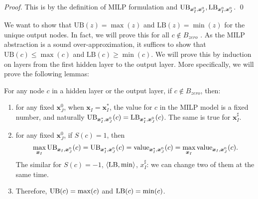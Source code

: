 			\begin{proof}
				This is by the definition of MILP formulation and $\mathrm{UB}_{\boldsymbol{x}^0_I,\boldsymbol{x}^0_J}, \mathrm{LB}_{\boldsymbol{x}^0_I,\boldsymbol{x}^0_J}$. \qed
			\end{proof}
			
	
			
			
			We want to show that $\mathrm{UB}(z) = \max (z)$ and $\mathrm{LB}(z) = \min (z)$ for the unique output nodes. In fact, we will prove this for all $c\notin B_{zero}$ . As the MILP abstraction is a sound over-approximation, 
			it suffices to show that $\mathrm{UB}(c)\leq \max (c)$ and $\mathrm{LB}(c) \geq \min (c)$. We will prove this by induction on layers from the first hidden layer to the output layer. More specifically, we will prove the following lemmas:
			
			
			\begin{lemma} \label{lem:main}
				For any node $c$ in a hidden layer or the output layer, if $c\notin B_{zero}$, then:		\begin{enumerate}
					\item for any fixed $\boldsymbol{x}^0_J$, when  $\boldsymbol{x}_I=\boldsymbol{x}^*_I$, the value for $c$ in the MILP model is a fixed number, and naturally $\mathrm{UB}_{\boldsymbol{x}^*_I,\boldsymbol{x}^0_J}(c)=\mathrm{LB}_{\boldsymbol{x}^*_I,\boldsymbol{x}^0_J}(c)$. The same is true for $\boldsymbol{x}^\sharp_I$.
					
					\item for any fixed $\boldsymbol{x}^0_J$, if $S(c)=1$, then $$\max_{\boldsymbol{x}_I} \mathrm{UB}_{\boldsymbol{x}_I,\boldsymbol{x}^0_J}(c)=\mathrm{UB}_{\boldsymbol{x}^*_I,\boldsymbol{x}^0_J}(c)= {\textrm{value}}_{\boldsymbol{x}^*_I,\boldsymbol{x}^0_J}(c) = \max_{\boldsymbol{x}_I} {\textrm{value}}_{\boldsymbol{x}_I,\boldsymbol{x}^0_J}(c).$$ The similar for $S(c)=-1$, $\langle \mathrm{LB},\min\rangle$, $x^\sharp_I$: we can change two of them at the same time.
					
					\item Therefore, $\mathrm{UB}(c)=\max(c)$ and $\mathrm{LB}(c)=\min(c)$.
				\end{enumerate}
				
				
				
			\end{lemma}
			
